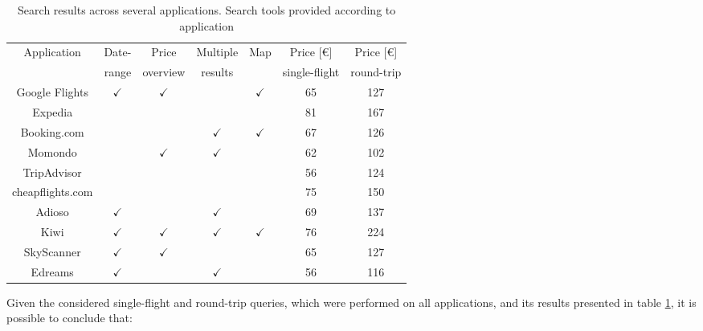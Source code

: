 \begin{table}[]
  \centering
  \caption{Search results across several applications. Search tools provided according to application}
  \label{tab:single_round_flights}
  \begin{tabular}{c|c|c|c|c|c|c}
  \hline
\multirow{2}{*}{Application} & Date- & Price & Multiple &  \multirow{2}{*}{Map}   & Price [€]    & Price [€]    \\ 
 & range         & overview      & results       &       & single-flight    & round-trip      \\ \hline
  Google Flights      & $\checkmark$ &  $\checkmark$ &            & $\checkmark$ & 65       & 127 \\ \hline
  Expedia             &   &            &            & & 81 & 167\\ \hline
  Booking.com        & & & $\checkmark$ & $\checkmark$ & 67 & 126 \\ \hline
  Momondo             & & $\checkmark$ & $\checkmark$ & & 62   & \cellcolor[HTML]{C0C0C0}102 \\ \hline
  TripAdvisor         &  & & &  & \cellcolor[HTML]{C0C0C0}56 & 124 \\ \hline
  cheapflights.com    & & & & & 75 & 150 \\ \hline
  Adioso              & $\checkmark$ & & $\checkmark$ & & 69 & 137 \\ \hline
  Kiwi                & $\checkmark$ & $\checkmark$ & $\checkmark$ & $\checkmark$ & 76 & 224 \\ \hline
  SkyScanner          & $\checkmark$ & $\checkmark$ &  & & 65 & 127 \\ \hline
  Edreams             & $\checkmark$ & & $\checkmark$ & & \cellcolor[HTML]{C0C0C0}56 & 116 \\ \hline
  \end{tabular}
\end{table}
  
Given the considered single-flight and round-trip queries, which were performed on all applications, and its results presented in table \ref{tab:single_round_flights}, it is possible to conclude that: 

